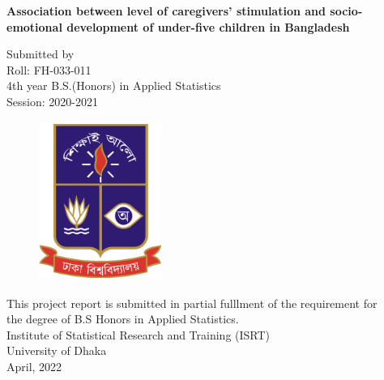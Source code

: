 \documentclass[
  12pt,
  oneside]{report}
\begin{document}
\newpage



\begin{center}
\huge{\textbf{Association between level of caregivers' stimulation and socio-emotional development of under-five children in Bangladesh}}\\

\vspace*{1.5\baselineskip}

\textbf\Large{{Submitted by}}\\
\vspace{2mm}
\Large{Roll: FH-033-011\\
\vspace{2mm}
4th year B.S.(Honors) in Applied Statistics\\
\vspace{2mm}
Session: 2020-2021}\\

\vspace*{1.5\baselineskip}

\begin{figure}
  \centering
  \includegraphics[width=4cm, height=5.2cm]{../logo/du_logo_high.JPG}
\end{figure}


\vspace*{1.5\baselineskip}

\large{This project report is submitted in partial fulllment of the requirement for}\\
\large{the degree of B.S Honors in Applied Statistics.} \\
\vspace*{2\baselineskip}
\Large{Institute of Statistical Research and Training (ISRT) \\
University of Dhaka} \\
\Large{April, 2022}\\

\end{center}
\end{document}
